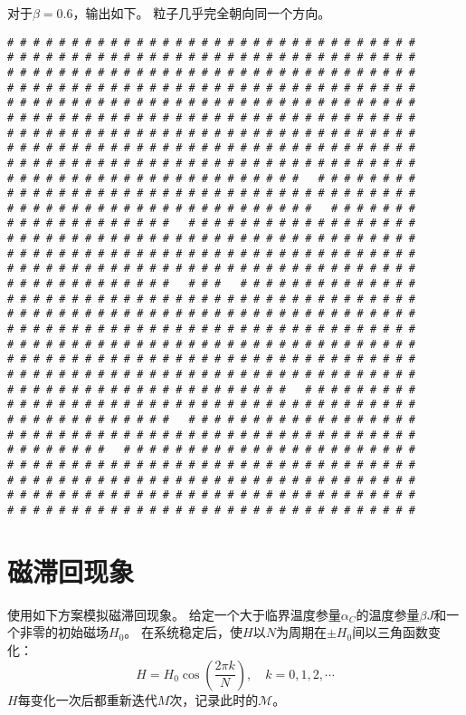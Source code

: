 \documentclass[a4paper,unicode]{report}
\begin{document}
对于$\beta=0.6$，输出如下。
粒子几乎完全朝向同一个方向。
{
\linespread{0.7}
\scriptsize
\begin{verbatim}
# # # # # # # # # # # # # # # # # # # # # # # # # # # # # # # #
# # # # # # # # # # # # # # # # # # # # # # # # # # # # # # # #
# # # # # # # # # # # # # # # # # # # # # # # # # # # # # # # #
# # # # # # # # # # # # # # # # # # # # # # # # # # # # # # # #
# # # # # # # # # # # # # # # # # # # # # # # # # # # # # # # #
# # # # # # # # # # # # # # # # # # # # # # # # # # # # # # # #
# # # # # # # # # # # # # # # # # # # # # # # # # # # # # # # #
# # # # # # # # # # # # # # # # # # # # # # # # # # # # # # # #
# # # # # # # # # # # # # # # # # # # # # # # # # # # # # # # #
# # # # # # # # # # # # # # # # # # # # # # #   # # # # # # # #
# # # # # # # # # # # # # # # # # # # # # # # # # # # # # # # #
# # # # # # # # # # # # # # # # # # # # # # # #   # # # # # # #
# # # # # # # # # # # # #   # # # # # # # # # # # # # # # # # #
# # # # # # # # # # # # # # # # # # # # # # # # # # # # # # # #
# # # # # # # # # # # # # # # # # # # # # # # # # # # # # # # #
# # # # # # # # # # # # # # # # # # # # # # # # # # # # # # # #
# # # # # # # # # # # # #   # # #   # # # # # # # # # # # # # #
# # # # # # # # # # # # # # # # # # # # # # # # # # # # # # # #
# # # # # # # # # # # # # # # # # # # # # # # # # # # # # # # #
# # # # # # # # # # # # # # # # # # # # # # # # # # # # # # # #
# # # # # # # # # # # # # # # # # # # # # # # # # # # # # # # #
# # # # # # # # # # # # # # # # # # # # # # # # # # # # # # # #
# # # # # # # # # # # # # # # # # # # # # # # # # # # # # # # #
# # # # # # # # # # # # # # # # # # # # # #   # # # # # # # # #
# # # # # # # # # # # # # # # # # # # # # # # # # # # # # # # #
# # # # # # # # # # # # #   # # # # # # # # # # # # # # # # # #
# # # # # # # # # # # # # # # # # # # # # # # # # # # # # # # #
# # # # # # # #   # # # # # # # # # # # # # # # # # # # # # # #
# # # # # # # # # # # # # # # # # # # # # # # # # # # # # # # #
# # # # # # # # # # # # # # # # # # # # # # # # # # # # # # # #
# # # # # # # # # # # # # # # # # # # # # # # # # # # # # # # #
# # # # # # # # # # # # # # # # # # # # # # # # # # # # # # # #
\end{verbatim}
}

\section{磁滞回现象}
使用如下方案模拟磁滞回现象。
给定一个大于临界温度参量$\alpha_C$的温度参量$\beta J$和一个非零的初始磁场$H_0$。
在系统稳定后，使$H$以$N$为周期在$\pm H_0$间以三角函数变化：
\begin{equation}
    H = H_0 \cos(\frac{2\pi k}{N}),\quad k = 0, 1, 2, \cdots
\end{equation}
$H$每变化一次后都重新迭代$M$次，记录此时的$\mathcal{M}$。
\end{document}
